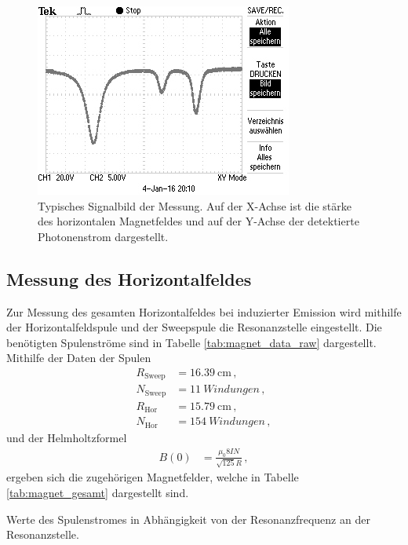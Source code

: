 \begin{figure}[!h]
    \centering
    \includegraphics[width=0.7\linewidth]{data/TEK0002.jpg}
    \caption{Typisches Signalbild der Messung. Auf der X-Achse ist die stärke des horizontalen Magnetfeldes und auf der Y-Achse der detektierte Photonenstrom dargestellt.}
    \label{fig:typisches_signalbild}
\end{figure}

\FloatBarrier
\subsection{Messung des Horizontalfeldes} %
\label{sub:typisches_signalbild}

Zur Messung des gesamten Horizontalfeldes bei induzierter Emission wird mithilfe der Horizontalfeldspule und der Sweepspule die Resonanzstelle eingestellt.
Die benötigten Spulenströme sind in Tabelle \ref{tab:magnet_data_raw} dargestellt.
Mithilfe der Daten der Spulen
\begin{align*}
    R_\text{Sweep} &= \SI{16.39}{\centi\meter}\,,\\
    N_\text{Sweep} &= \SI{11}{Windungen}\,,\\
    R_\text{Hor} &= \SI{15.79}{\centi\meter}\,,\\
    N_\text{Hor} &= \SI{154}{Windungen}\,,
\end{align*}
und der Helmholtzformel
\begin{align*}
    B(0) &= \frac{\mu_0 8 I N}{\sqrt{125} R}\,,
\end{align*}
ergeben sich die zugehörigen Magnetfelder, welche in Tabelle \ref{tab:magnet_gesamt} dargestellt sind.

\begin{table}[!h]
    \centering
    \caption{Werte des Spulenstromes in Abhängigkeit von der Resonanzfrequenz an der Resonanzstelle.}
    
    \label{tab:magnet_data_raw}
\end{table}

